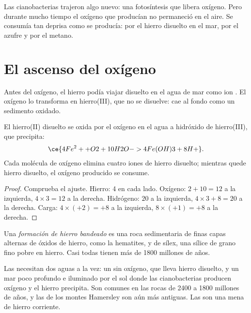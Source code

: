 Las cianobacterias trajeron algo nuevo: una fotosíntesis que libera oxígeno.
Pero durante mucho tiempo el oxígeno que producían no permaneció en el aire.
Se consumía tan deprisa como se producía: por el hierro disuelto en el mar,
por el azufre y por el metano.

\section{El ascenso del oxígeno}

Antes del oxígeno, el hierro podía viajar disuelto en el agua de mar como ion
. El oxígeno lo transforma en hierro(III), que no se disuelve: cae
al fondo como un sedimento oxidado.

\begin{proposition}\label{prop:g12:early-earth:iron}
El hierro(II) disuelto se oxida por el oxígeno en el agua a hidróxido de
hierro(III), que precipita:
\[
  \ce{4Fe^2+ + O2 + 10H2O -> 4Fe(OH)3 + 8H+} .
\]
Cada molécula de oxígeno elimina cuatro iones de hierro disuelto; mientras
quede hierro disuelto, el oxígeno producido se consume.
\end{proposition}

\begin{proof}
Comprueba el ajuste. Hierro: 4 en cada lado. Oxígeno: $2 + 10 = 12$ a la
izquierda, $4 \times 3 = 12$ a la derecha. Hidrógeno: $20$ a la izquierda,
$4 \times 3 + 8 =
20$ a la derecha. Carga: $4 \times (+2) = +8$ a la
izquierda, $8 \times (+1) =
+8$ a la derecha.
\end{proof}

\begin{definition}\label{def:g12:early-earth:bif}
Una \emph{formación de hierro bandeado}
es una roca sedimentaria de finas capas alternas de óxidos de hierro, como la
hematites, y de sílex, una sílice de grano fino pobre en hierro. Casi todas
tienen más de 1800 millones de años.
\end{definition}

Las  necesitan dos aguas a la vez: un  sin oxígeno, que lleva hierro disuelto, y un mar poco profundo e
iluminado por el sol donde las cianobacterias producen oxígeno y el hierro
precipita. Son comunes en las rocas de 2400 a 1800 millones de años, y las de
los montes Hamersley son aún más antiguas. Las 
son una mena de hierro corriente.


